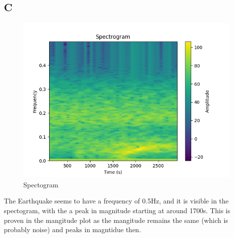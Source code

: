 \documentclass{article}
\begin{document}
\subsection*{C}
\begin{figure}
    \includegraphics[width=\textwidth]{Ex 5c.png}
    \caption{Spectogram}
\end{figure}
The Earthquake seems to have a frequency of 0.5Hz, and it is visible in the spectogram, with the a peak in magnitude starting at around 1700s. This is proven in the mangitude plot as the mangitude remains the same (which is probably noise) and peaks in magntidue then. \\
\end{document}
